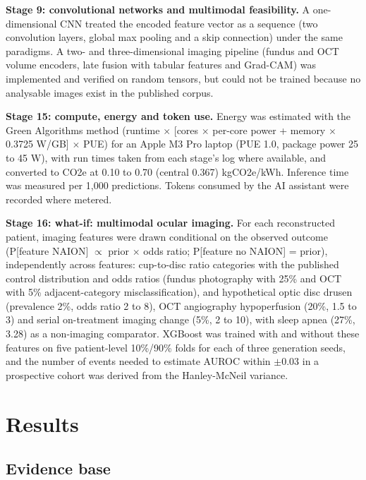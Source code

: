 \documentclass[journal]{IEEEtran}
\begin{document}
\textbf{Stage 9: convolutional networks and multimodal feasibility.}
A one-dimensional CNN treated the encoded feature vector as a sequence
(two convolution layers, global max pooling and a skip connection) under
the same paradigms. A two- and three-dimensional imaging pipeline
(fundus and OCT volume encoders, late fusion with tabular features and
Grad-CAM) was implemented and verified on random tensors, but could not
be trained because no analysable images exist in the published corpus.

\textbf{Stage 15: compute, energy and token use.} Energy was
estimated with the Green Algorithms method (runtime \ensuremath{\times} {[}cores \ensuremath{\times}
per-core power + memory \ensuremath{\times} 0.3725 W/GB{]} \ensuremath{\times} PUE) for an Apple M3 Pro
laptop (PUE 1.0, package power 25 to 45 W), with run times taken from
each stage's log where available, and converted to CO2e at 0.10 to 0.70
(central 0.367) kgCO2e/kWh. Inference time was measured per 1,000
predictions. Tokens consumed by the AI assistant were recorded where
metered.

\textbf{Stage 16: what-if: multimodal ocular imaging.} For each
reconstructed patient, imaging features were drawn conditional on the
observed outcome (P{[}feature \textbar{} NAION{]} \ensuremath{\propto} prior \ensuremath{\times} odds ratio;
P{[}feature \textbar{} no NAION{]} = prior), independently across
features: cup-to-disc ratio categories with the published control
distribution and odds ratios (fundus photography with 25\% and OCT with
5\% adjacent-category misclassification), and hypothetical optic disc
drusen (prevalence 2\%, odds ratio 2 to 8), OCT angiography
hypoperfusion (20\%, 1.5 to 3) and serial on-treatment imaging change
(5\%, 2 to 10), with sleep apnea (27\%, 3.28) as a non-imaging
comparator. XGBoost was trained with and without these features on five
patient-level 10\%/90\% folds for each of three generation seeds, and
the number of events needed to estimate AUROC within \ensuremath{\pm}0.03 in a
prospective cohort was derived from the Hanley-McNeil variance.

\section{Results}\label{results}

\subsection{Evidence base}\label{evidence-base}
\end{document}
